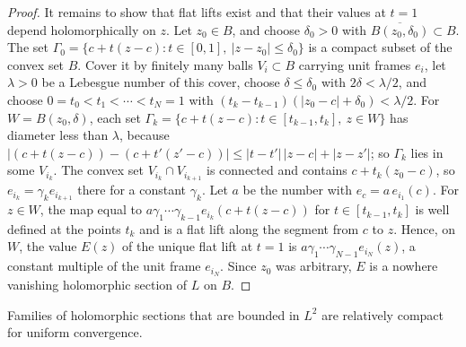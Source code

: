 \begin{proof}
It remains to show that flat lifts exist and that their values at $t=1$ depend holomorphically on $z$. Let $z_0\in B$, and choose $\delta_0>0$ with $\overline{B(z_0,\delta_0)}\subset B$. The set $\Gamma_0=\{c+t(z-c):t\in[0,1],\ |z-z_0|\leq\delta_0\}$ is a compact subset of the convex set $B$. Cover it by finitely many balls $V_i\subset B$ carrying unit frames $e_i$, let $\lambda>0$ be a Lebesgue number of this cover, choose $\delta\leq\delta_0$ with $2\delta<\lambda/2$, and choose $0=t_0<t_1<\cdots<t_N=1$ with $(t_k-t_{k-1})(|z_0-c|+\delta_0)<\lambda/2$. For $W=B(z_0,\delta)$, each set $\Gamma_k=\{c+t(z-c):t\in[t_{k-1},t_k],\ z\in W\}$ has diameter less than $\lambda$, because $|(c+t(z-c))-(c+t'(z'-c))|\leq|t-t'|\,|z-c|+|z-z'|$; so $\Gamma_k$ lies in some $V_{i_k}$. The convex set $V_{i_k}\cap V_{i_{k+1}}$ is connected and contains $c+t_k(z_0-c)$, so $e_{i_k}=\gamma_ke_{i_{k+1}}$ there for a constant $\gamma_k$. Let $a$ be the number with $e_c=a\,e_{i_1}(c)$. For $z\in W$, the map equal to $a\gamma_1\cdots\gamma_{k-1}e_{i_k}(c+t(z-c))$ for $t\in[t_{k-1},t_k]$ is well defined at the points $t_k$ and is a flat lift along the segment from $c$ to $z$. Hence, on $W$, the value $E(z)$ of the unique flat lift at $t=1$ is $a\gamma_1\cdots\gamma_{N-1}e_{i_N}(z)$, a constant multiple of the unit frame $e_{i_N}$. Since $z_0$ was arbitrary, $E$ is a nowhere vanishing holomorphic section of $L$ on $B$.
\end{proof}

Families of holomorphic sections that are bounded in $L^2$ are relatively compact for uniform convergence.

